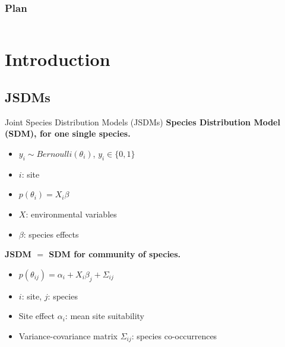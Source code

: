 \documentclass[
  10pt,
  ignorenonframetext,
  table, dvipsname, compress]{beamer}
\providecommand{\tightlist}{%
  \setlength{\itemsep}{0pt}\setlength{\parskip}{0pt}}
\newif\ifplacelogo %
\begin{document}

\placelogotrue
\begin{frame}
  \frametitle{Plan}
  \begin{columns}[c]
    \begin{column}{0.5\textwidth}
      \tableofcontents[sections=1]
      \vspace{0.5cm}
      \tableofcontents[sections=2]
    \end{column}
    \begin{column}{0.5\textwidth}
        \tableofcontents[sections=3]
        \vspace{0.5cm}
        \tableofcontents[sections=4]
    \end{column}
  \end{columns}
\end{frame}
\placelogofalse

\hypertarget{introduction}{%
\section{Introduction}\label{introduction}}

\hypertarget{jsdms}{%
\subsection{JSDMs}\label{jsdms}}

\begin{frame}{Joint Species Distribution Models (JSDMs)}
\protect\hypertarget{joint-species-distribution-models-jsdms}{}
\textbf{Species Distribution Model (SDM), for one single species.}

\begin{itemize}
\tightlist
\item
  \(y_i \sim Bernoulli(\theta_i)\), \(y_i \in \{0,1\}\)
\item
  \(i\): site
\item
  \(p(\theta_i) = X_i \beta\)
\item
  \(X\): environmental variables
\item
  \(\beta\): species effects
\end{itemize}

\textbf{JSDM \(=\) SDM for community of species.}

\begin{itemize}
\tightlist
\item
  \(p(\theta_{ij}) = \alpha_i + X_i \beta_j + \Sigma_{ij}\)
\item
  \(i\): site, \(j\): species
\item
  Site effect \(\alpha_i\): mean site suitability
\item
  Variance-covariance matrix \(\Sigma_{ij}\): species co-occurrences
\end{itemize}
\end{frame}
\end{document}
